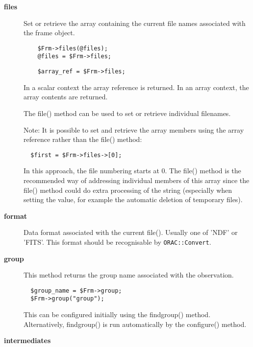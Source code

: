 \begin{description}
\item[\textbf{files}] \mbox{}

Set or retrieve the array containing the current file names
associated with the frame object.

\begin{verbatim}
    $Frm->files(@files);
    @files = $Frm->files;
\end{verbatim}
\begin{verbatim}
    $array_ref = $Frm->files;
\end{verbatim}


In a scalar context the array reference is returned.
In an array context, the array contents are returned.



The file() method can be used to set or retrieve individual
filenames.



Note: It is possible to set and retrieve the array members using
the array reference rather than the file() method:

\begin{verbatim}
  $first = $Frm->files->[0];
\end{verbatim}


In this approach, the file numbering starts at 0. The file() method
is the recommended way of addressing individual members of this
array since the file() method could do extra processing of the
string (especially when setting the value, for example the automatic
deletion of temporary files).


\item[\textbf{format}] \mbox{}

Data format associated with the current file().
Usually one of 'NDF' or 'FITS'. This format should be
recognisable by \texttt{ORAC::Convert}.


\item[\textbf{group}] \mbox{}

This method returns the group name associated with the observation.

\begin{verbatim}
  $group_name = $Frm->group;
  $Frm->group("group");
\end{verbatim}


This can be configured initially using the findgroup() method.
Alternatively, findgroup() is run automatically by the configure()
method.


\item[\textbf{intermediates}] \mbox{}


\end{description}
